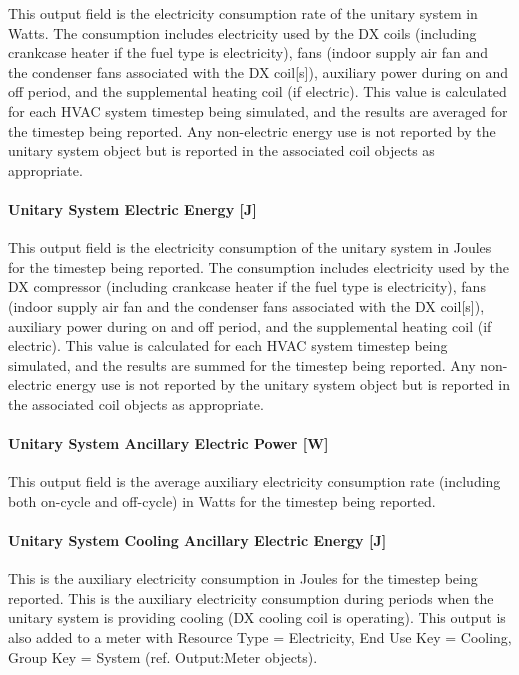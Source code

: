 This output field is the electricity consumption rate of the unitary system in Watts. The consumption includes electricity used by the DX coils (including crankcase heater if the fuel type is electricity), fans (indoor supply air fan and the condenser fans associated with the DX coil{[}s{]}), auxiliary power during on and off period, and the supplemental heating coil (if electric). This value is calculated for each HVAC system timestep being simulated, and the results are averaged for the timestep being reported. Any non-electric energy use is not reported by the unitary system object but is reported in the associated coil objects as appropriate.

\paragraph{Unitary System Electric Energy {[}J{]}}\label{unitary-system-electric-energy-j}

This output field is the electricity consumption of the unitary system in Joules for the timestep being reported. The consumption includes electricity used by the DX compressor (including crankcase heater if the fuel type is electricity), fans (indoor supply air fan and the condenser fans associated with the DX coil{[}s{]}), auxiliary power during on and off period, and the supplemental heating coil (if electric). This value is calculated for each HVAC system timestep being simulated, and the results are summed for the timestep being reported. Any non-electric energy use is not reported by the unitary system object but is reported in the associated coil objects as appropriate.

\paragraph{Unitary System Ancillary Electric Power {[}W{]}}\label{unitary-system-ancillary-electric-power-w}

This output field is the average auxiliary electricity consumption rate (including both on-cycle and off-cycle) in Watts for the timestep being reported.

\paragraph{Unitary System Cooling Ancillary Electric Energy {[}J{]}}\label{unitary-system-cooling-ancillary-electric-energy-j}

This is the auxiliary electricity consumption in Joules for the timestep being reported. This is the auxiliary electricity consumption during periods when the unitary system is providing cooling (DX cooling coil is operating). This output is also added to a meter with Resource Type = Electricity, End Use Key = Cooling, Group Key = System (ref. Output:Meter objects).

